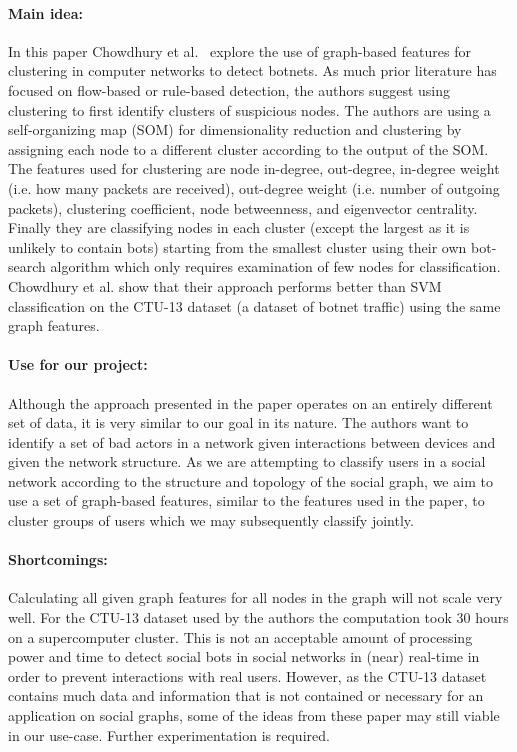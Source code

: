 \paragraph{Main idea:}
In this paper Chowdhury et al.~\cite{chowdhury2017botnet} explore the use of graph-based features for clustering in computer networks to detect botnets. As much prior literature has focused on flow-based or rule-based detection, the authors suggest using clustering to first identify clusters of suspicious nodes. The authors are using a self-organizing map (SOM) for dimensionality reduction and clustering by assigning each node to a different cluster according to the output of the SOM. The features used for clustering are node in-degree, out-degree, in-degree weight (i.e. how many packets are received), out-degree weight (i.e. number of outgoing packets), clustering coefficient, node betweenness, and eigenvector centrality. Finally they are classifying nodes in each cluster (except the largest as it is unlikely to contain bots) starting from the smallest cluster using their own bot-search algorithm which only requires examination of few nodes for classification.
Chowdhury et al. show that their approach performs better than SVM classification on the CTU-13 dataset (a dataset of botnet traffic) using the same graph features.

\paragraph{Use for our project:}
Although the approach presented in the paper operates on an entirely different set of data, it is very similar to our goal in its nature. The authors want to identify a set of bad actors in a network given interactions between devices and given the network structure. As we are attempting to classify users in a social network according to the structure and topology of the social graph, we aim to use a set of graph-based features, similar to the features used in the paper, to cluster groups of users which we may subsequently classify jointly.

\paragraph{Shortcomings:}
Calculating all given graph features for all nodes in the graph will not scale very well. For the CTU-13 dataset used by the authors the computation took 30 hours on a supercomputer cluster. This is not an acceptable amount of processing power and time to detect social bots in social networks in (near) real-time in order to prevent interactions with real users. However, as the CTU-13 dataset contains much data and information that is not contained or necessary for an application on social graphs, some of the ideas from these paper may still viable in our use-case. Further experimentation is required.

